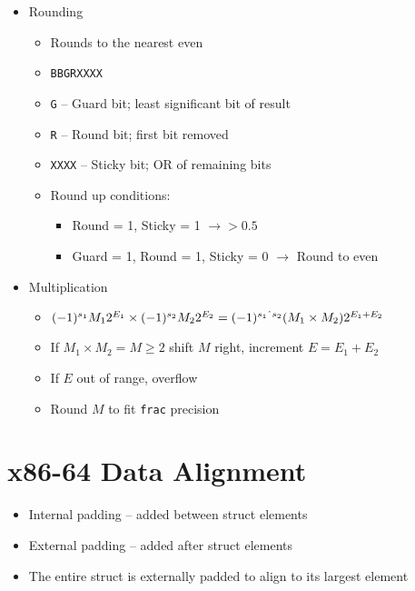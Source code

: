 \documentclass[twocolumn]{article}
\renewcommand{\tt}[1]{\texttt{#1}}
\begin{document}
\begin{itemize}[noitemsep]
\begin{itemize}[noitemsep]
    \end{itemize}
    \item Rounding
    \begin{itemize}[noitemsep]
        \item Rounds to the nearest even
        \item \tt{BBGRXXXX}
        \item \tt{G} -- Guard bit; least significant bit of result
        \item \tt{R} -- Round bit; first bit removed
        \item \tt{XXXX} -- Sticky bit; OR of remaining bits
        \item Round up conditions:
        \begin{itemize}[noitemsep]
            \item Round = 1, Sticky = 1 $\to > 0.5$
            \item Guard = 1, Round = 1, Sticky = 0 $\to$ Round to even
        \end{itemize}
    \end{itemize}
    \item Multiplication
    \begin{itemize}[noitemsep]
        \item $(-1)^{s_1}M_12^{E_1} \times (-1)^{s_2}M_22^{E_2} = (-1)^{s_1 \string^ s_2}(M_1 \times M_2)2^{E_1 + E_2}$
        \item If $M_1 \times M_2 = M \geq 2$ shift $M$ right, increment $E = E_1 + E_2$
        \item If $E$ out of range, overflow
        \item Round $M$ to fit \tt{frac} precision
    \end{itemize}
\end{itemize}

\vfill
\pagebreak

\section{x86-64 Data Alignment}
\begin{itemize}[noitemsep]
    \item Internal padding -- added between struct elements
    \item External padding -- added after struct elements
    \item The entire struct is externally padded to align to its largest element
\end{itemize}
\end{document}

